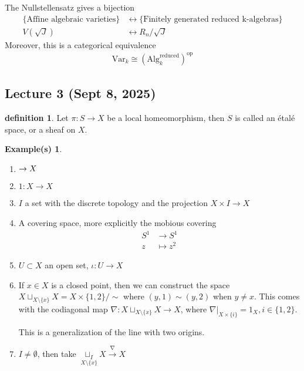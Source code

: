 \documentclass[10.5pt]{article}
\theoremstyle{definition}
\newtheorem{definition}{definition}
\newtheorem*{example}{Example(s)}
\newcommand{\set}[1]{\{#1\}}
\begin{document}
    The Nullstellensatz gives a bijection
    \begin{align*}
        \set{\text{Affine algebraic varieties}} &\longleftrightarrow \set{\text{Finitely generated reduced k-algebras}} \\
        V(\sqrt{J}) &\longleftrightarrow R_n/\sqrt{J}
    \end{align*}
    Moreover, this is a categorical equivalence
    \begin{align*}
        \text{Var}_k \cong \left(\text{Alg}_k^{\text{reduced}}\right)^{\text{op}}
    \end{align*}
    

    \subsection{Lecture 3 (Sept 8, 2025)}

    \begin{definition}
        Let \(\pi: S \to X\) be a local homeomorphism, then \(S\) is called an \'etal\'e space, or a sheaf on \(X\).
    \end{definition}

    \begin{example}
        \begin{enumerate}
            \item \(\empty \to X\)
            \item \(1: X \to X\)
            \item \(I\) a set with the discrete topology and the projection \(X \times I \to X\)
            \item A covering space, more explicitly the mobious covering
            \begin{align*}
                S^1 &\to S^1 \\ z &\mapsto z^2
            \end{align*}
            \item \(U \subset X\) an open set, \(\iota: U \to X\)
            \item If \(x \in X\) is a closed point, then we can construct the space \(X \sqcup_{X \setminus \set{x}}X = X \times \set{1,2}/\sim\) where \((y,1) \sim (y,2)\) when \(y \neq x\). This comes with the codiagonal map \(\nabla: X \sqcup_{X \setminus \set{x}}X \to X\), where \(\nabla\vert_{X \times \set{i}} = 1_X, i \in \set{1,2}\).
            
            This is a generalization of the line with two origins.
            \item \(I \neq \emptyset\), then take \(\underset{X \setminus \set{x}}{\sqcup_I} X \overset{\nabla}{\longrightarrow} X\)
        \end{enumerate}
    \end{example}
\end{document}
